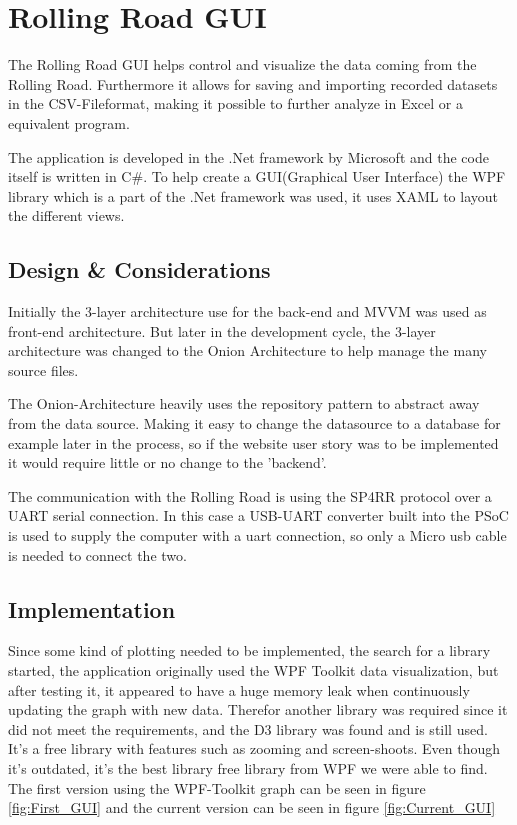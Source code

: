 \section{Rolling Road GUI}

The Rolling Road GUI helps control and visualize the data coming from the Rolling Road. Furthermore it allows for saving and importing recorded datasets in the CSV-Fileformat, making it possible to further analyze in Excel or a equivalent program.

The application is developed in the .Net framework by Microsoft and the code itself is written in C\#.
To help create a GUI(Graphical User Interface) the WPF library which is a part of the .Net framework was used, it uses XAML to layout the different views.

\subsection{Design \& Considerations}

Initially the 3-layer architecture use for the back-end and MVVM was used as front-end architecture. But later in the development cycle, the 3-layer architecture was changed to the Onion Architecture to help manage the many source files.

The Onion-Architecture heavily uses the repository pattern to abstract away from the data source. Making it easy to change the datasource to a database for example later in the process, so if the website user story was to be implemented it would require little or no change to the 'backend'.

The communication with the Rolling Road is using the SP4RR protocol over a UART serial connection. In this case a USB-UART converter built into the PSoC is used to supply the computer with a uart connection, so only a Micro usb cable is needed to connect the two.

\subsection{Implementation}

Since some kind of plotting needed to be implemented, the search for a library started, the application originally used the WPF Toolkit data visualization, but after testing it, it appeared to have a huge memory leak when continuously updating the graph with new data. Therefor another library was required since it did not meet the requirements, and the D3 library was found and is still used. It's a free library with features such as zooming and screen-shoots. Even though it's outdated, it's the best library free library from WPF we were able to find. The first version using the WPF-Toolkit graph can be seen in figure \vref{fig:First_GUI} and the current version can be seen in figure \vref{fig:Current_GUI}

